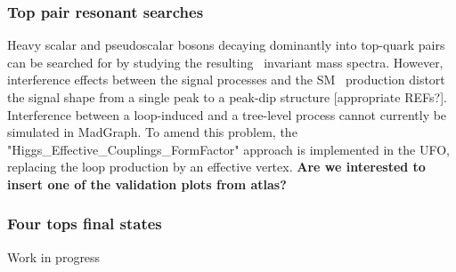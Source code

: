 \subsubsection{Top pair resonant searches}
Heavy scalar and pseudoscalar bosons decaying dominantly into top-quark pairs can be
searched for by studying the resulting \ttbar\ invariant mass
spectra. However, interference effects between the signal processes
and the SM \ttbar\ production distort the signal shape from a single
peak to a peak-dip structure [appropriate REFs?]. Interference between
a loop-induced and a tree-level process cannot currently be simulated in MadGraph.
To amend this problem, the "Higgs\_Effective\_Couplings\_FormFactor"
approach \cite{ttinterfHFF} is implemented in the UFO, replacing the loop production by an
effective vertex.
\textbf{Are we interested to insert one of the validation plots from atlas?}

\subsubsection{Four tops final states}

Work in progress



%



